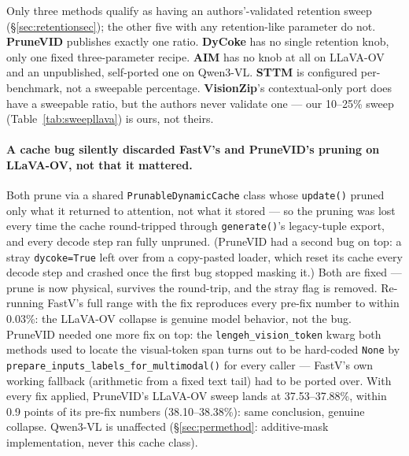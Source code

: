\documentclass[11pt]{article}
\begin{document}
Only three methods qualify as having an authors'-validated retention sweep
(\S\ref{sec:retentionsec}); the other five with any
retention-like parameter do not. \textbf{PruneVID} publishes exactly one
ratio. \textbf{DyCoke} has no
single retention knob, only one fixed three-parameter recipe. \textbf{AIM}
has no knob at all on LLaVA-OV and an unpublished, self-ported one on
Qwen3-VL. \textbf{STTM} is configured per-benchmark, not a sweepable
percentage. \textbf{VisionZip}'s contextual-only port does have a
sweepable ratio, but the authors never validate one --- our 10--25\% sweep
(Table~\ref{tab:sweepllava}) is ours, not theirs.

\paragraph{A cache bug silently discarded FastV's and PruneVID's pruning on
LLaVA-OV, not that it mattered.} Both prune via a shared
\texttt{PrunableDynamicCache} class whose \texttt{update()} pruned only
what it returned to attention, not what it stored --- so the pruning was
lost every time the cache round-tripped through
\texttt{generate()}'s legacy-tuple export, and every decode step ran
fully unpruned. (PruneVID had a second bug on top: a stray
\texttt{dycoke=True} left over from a copy-pasted loader, which reset its
cache every decode step and crashed once the first bug stopped masking
it.) Both are fixed --- prune is now physical, survives the round-trip, and
the stray flag is removed. Re-running FastV's full range with the fix
reproduces every pre-fix number to within 0.03\%: the LLaVA-OV collapse is
genuine model behavior, not the bug. PruneVID needed one more fix on top:
the \texttt{lengeh\_vision\_token} kwarg both methods used to locate the
visual-token span turns out to be hard-coded \texttt{None} by
\texttt{prepare\_inputs\_labels\_for\_multimodal()} for every caller ---
FastV's own working fallback (arithmetic from a fixed text tail) had to be
ported over. With every fix applied, PruneVID's LLaVA-OV sweep lands at
37.53--37.88\%, within 0.9 points of its pre-fix numbers
(38.10--38.38\%): same conclusion, genuine collapse. Qwen3-VL is
unaffected (\S\ref{sec:permethod}: additive-mask implementation, never
this cache class).
\end{document}
